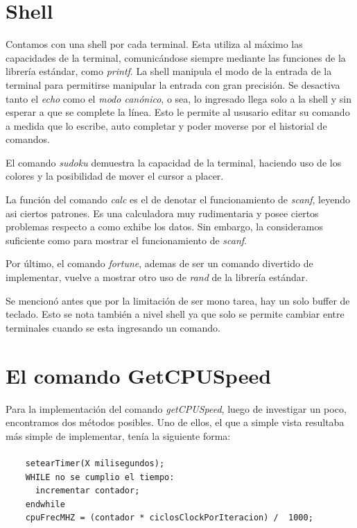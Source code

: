\documentclass[a4paper,10pt]{article}
\begin{document}
\section{Shell}
    Contamos con una shell por cada terminal.
    Esta utiliza al máximo las capacidades de la terminal, comunicándose siempre mediante las funciones de la librería estándar, como \textit{printf}.
    La shell manipula el modo de la entrada de la terminal para permitirse manipular la entrada con gran precisión.
    Se desactiva tanto el \textit{echo} como el \textit{modo canónico}, o sea, lo ingresado llega solo a la shell y sin esperar a que se complete la línea.
    Esto le permite al ususario editar su comando a medida que lo escribe, auto completar y poder moverse por el historial de comandos.

    El comando \textit{sudoku} demuestra la capacidad de la terminal, haciendo uso de los colores y la posibilidad de mover el cursor a placer.
    
    La función del comando \textit{calc} es el de denotar el funcionamiento de \textit{scanf}, leyendo asi ciertos patrones.
    Es una calculadora muy rudimentaria y posee ciertos problemas respecto a como exhibe los datos.
    Sin embargo, la consideramos suficiente como para mostrar el funcionamiento de \textit{scanf}.
    
    Por último, el comando \textit{fortune}, ademas de ser un comando divertido de implementar, vuelve a mostrar otro uso de \textit{rand} de la librería estándar.

    Se mencionó antes que por la limitación de ser mono tarea, hay un solo buffer de teclado.
    Esto se nota también a nivel shell ya que solo se permite cambiar entre terminales cuando se esta ingresando un comando.

\newpage
\section{El comando GetCPUSpeed}
    Para la implementación del comando \textit{getCPUSpeed}, luego de investigar un poco, encontramos dos métodos posibles. Uno de ellos, el que a simple vista resultaba
    más simple de implementar, tenía la siguiente forma:
    \paragraph*{}
    \begin{lstlisting}
    setearTimer(X milisegundos);
    WHILE no se cumplio el tiempo:
	  incrementar contador;
    endwhile
    cpuFrecMHZ = (contador * ciclosClockPorIteracion) /  1000;
    \end{lstlisting}
\end{document}
